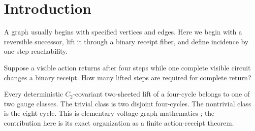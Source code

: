 \section{Introduction}

A graph usually begins with specified vertices and edges. Here we
begin with a reversible successor, lift it through a binary receipt
fiber, and define incidence by one-step reachability.

Suppose a visible action returns after four steps while one complete
visible circuit changes a binary receipt. How many lifted steps are
required for complete return?

Every deterministic \(C_2\)-covariant two-sheeted lift of a
four-cycle belongs to one of two gauge classes. The trivial class is
two disjoint four-cycles. The nontrivial class is the eight-cycle.
This is elementary voltage-graph mathematics
\cite{gross-tucker,biggs}; the contribution here is its exact
organization as a finite action-receipt theorem.
